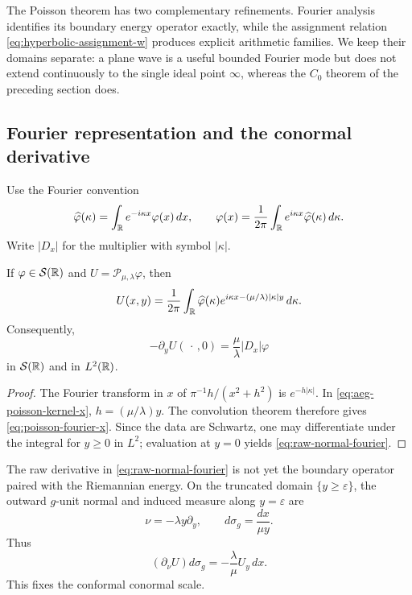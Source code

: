 The Poisson theorem has two complementary refinements.  Fourier analysis
identifies its boundary energy operator exactly, while the assignment relation
\eqref{eq:hyperbolic-assignment-w} produces explicit arithmetic families.  We
keep their domains separate: a plane wave is a useful bounded Fourier mode but
does not extend continuously to the single ideal point $\infty$, whereas the
$C_0$ theorem of the preceding section does.

\subsection{Fourier representation and the conormal derivative}

Use the Fourier convention
\begin{equation}\label{eq:fourier-convention-x}
 \widehat\varphi(\kappa)
 =\int_{\mathbb{R}}e^{-i\kappa x}\varphi(x)\,dx,
 \qquad
 \varphi(x)=\frac1{2\pi}\int_{\mathbb{R}}
 e^{i\kappa x}\widehat\varphi(\kappa)\,d\kappa.
\end{equation}
Write $|D_x|$ for the multiplier with symbol $|\kappa|$.

\begin{proposition}
\label{prop:poisson-fourier-formula}
If $\varphi\in\mathcal S(\mathbb{R})$ and
$U=\mathcal P_{\mu,\lambda}\varphi$, then
\begin{equation}\label{eq:poisson-fourier-x}
 U(x,y)=\frac1{2\pi}\int_{\mathbb{R}}
 \widehat\varphi(\kappa)
 e^{i\kappa x-(\mu/\lambda)|\kappa|y}\,d\kappa.
\end{equation}
Consequently,
\begin{equation}\label{eq:raw-normal-fourier}
 -\partial_yU(\,\cdot\,,0)
 =\frac{\mu}{\lambda}|D_x|\varphi
\end{equation}
in $\mathcal S(\mathbb{R})$ and in $L^2(\mathbb{R})$.
\end{proposition}

\begin{proof}
The Fourier transform in $x$ of
$\pi^{-1}h/(x^2+h^2)$ is $e^{-h|\kappa|}$.  In
\eqref{eq:aeg-poisson-kernel-x}, $h=(\mu/\lambda)y$.  The convolution theorem
therefore gives \eqref{eq:poisson-fourier-x}.  Since the data are Schwartz,
one may differentiate under the integral for $y\geq0$ in $L^2$; evaluation
at $y=0$ yields \eqref{eq:raw-normal-fourier}.
\end{proof}

The raw derivative in \eqref{eq:raw-normal-fourier} is not yet the boundary
operator paired with the Riemannian energy.  On the truncated domain
$\{y\geq\varepsilon\}$, the outward $g$-unit normal and induced measure along
$y=\varepsilon$ are
\begin{equation}\label{eq:hyperbolic-boundary-normal-measure}
 \nu=-\lambda y\partial_y,
 \qquad
 d\sigma_g=\frac{dx}{\mu y}.
\end{equation}
Thus
\[
 (\partial_\nu U)d\sigma_g
 =-\frac{\lambda}{\mu}U_y\,dx.
\]
This fixes the conformal conormal scale.

